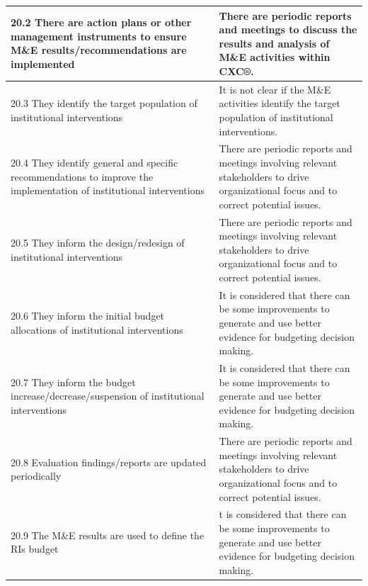 \documentclass[
  10pt,
]{book}
\begin{document}
\begin{table}
\begin{tabular}[t]{l|l}
\hline
\hspace{1em}\hspace{1em}20.2 There are action plans or other management instruments to ensure M\&E results/recommendations are implemented & There are periodic reports and meetings to discuss the results and analysis of M\&E activities within CXC®.\\
\hline
\hspace{1em}\hspace{1em}20.3 They identify the target population of institutional interventions & It is not clear if the M\&E activities identify the target population of institutional interventions.\\
\hline
\hspace{1em}\hspace{1em}20.4 They identify general and specific recommendations to improve the implementation of institutional interventions & There are periodic reports and meetings involving relevant stakeholders to drive organizational focus and to correct potential issues.\\
\hline
\hspace{1em}\hspace{1em}20.5 They inform the design/redesign of institutional interventions & There are periodic reports and meetings involving relevant stakeholders to drive organizational focus and to correct potential issues.\\
\hline
\hspace{1em}\hspace{1em}20.6 They inform the initial budget allocations of institutional interventions & It is considered that there can be some improvements to generate and use better evidence for budgeting decision making.\\
\hline
\hspace{1em}20.7 They inform the budget increase/decrease/suspension of institutional interventions & It is considered that there can be some improvements to generate and use better evidence for budgeting decision making.\\
\hline
\hspace{1em}20.8 Evaluation findings/reports are updated periodically & There are periodic reports and meetings involving relevant stakeholders to drive organizational focus and to correct potential issues.\\
\hline
20.9 The M\&E results are used to define the RIs budget & t is considered that there can be some improvements to generate and use better evidence for budgeting decision making.\\

\end{tabular}
\end{table}
\end{document}
